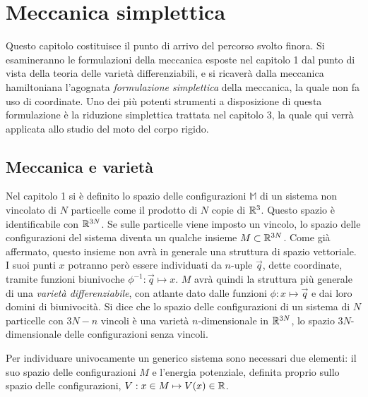 \chapter{Meccanica simplettica}
Questo capitolo costituisce il punto di arrivo del percorso svolto finora. Si esamineranno le formulazioni della meccanica esposte nel capitolo 1 dal punto di vista della teoria delle varietà differenziabili, e si ricaverà dalla meccanica hamiltoniana l'agognata \emph{formulazione simplettica} della meccanica, la quale non fa uso di coordinate. Uno dei più potenti strumenti a disposizione di questa formulazione è la riduzione simplettica trattata nel capitolo 3, la quale qui verrà applicata allo studio del moto del corpo rigido.

\section{Meccanica e varietà}
Nel capitolo 1 si è definito lo spazio delle configurazioni $\mathbb{M}$ di un sistema non vincolato di $N$ particelle come il prodotto di $N$ copie di $\mathbb{R}^{3}$. Questo spazio è identificabile con $\mathbb{R}^{3N}$. Se sulle particelle viene imposto un vincolo, lo spazio delle configurazioni del sistema diventa un qualche insieme $M \subset \mathbb{R}^{3N}$. Come già affermato, questo insieme non avrà in generale una struttura di spazio vettoriale. I suoi punti $x$ potranno però essere individuati da $n$-uple $\vec{q}$, dette coordinate, tramite funzioni biunivoche $\phi^{-1}: \vec{q} \mapsto x$. $M$ avrà quindi la struttura più generale di una \emph{varietà differenziabile}, con atlante dato dalle funzioni $\phi: x \mapsto \vec{q}$ e dai loro domini di biunivocità. Si dice che lo spazio delle configurazioni di un sistema di $N$ particelle con $3N-n$ vincoli è una varietà $n$-dimensionale  in $\mathbb{R}^{3N}$, lo spazio $3N$-dimensionale delle configurazioni senza vincoli.

Per individuare univocamente un generico sistema sono necessari due elementi: il suo spazio delle configurazioni $M$ e l'energia potenziale, definita proprio sullo spazio delle configurazioni, $V: x \in M \mapsto V(x) \in \mathbb{R}$.  



